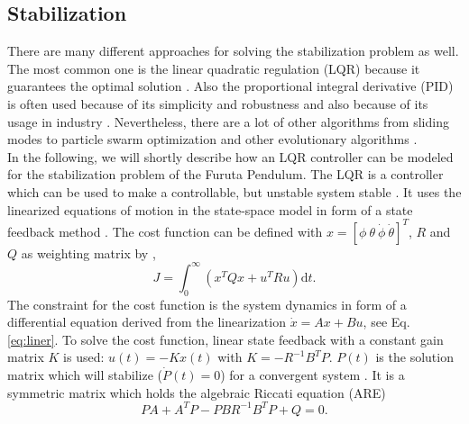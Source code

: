 \subsection{Stabilization}
There are many different approaches for solving the stabilization problem as 
well. The most common one is the linear quadratic regulation (LQR) because it 
guarantees the optimal solution \citep{hamza2019current}. Also the 
proportional integral derivative (PID) is often used because of its simplicity 
and robustness and also because of its usage in industry 
\citep{hassanzadeh2011controller}. Nevertheless, there are a lot of other 
algorithms from sliding modes \citep{izutsu2008swing} to particle swarm 
optimization and other evolutionary algorithms 
\citep{hassanzadeh2011controller}.\\
In the following, we will shortly describe how an LQR controller can be modeled 
for the stabilization problem of the Furuta Pendulum. The LQR is a controller 
which can be used to make a controllable, but unstable system stable 
\citep{park2011swing}. It uses the linearized equations of motion in the 
state-space model in form of a state feedback method \citep{ozbek2010swing}. 
The cost function can be defined with $x=[\phi \ \theta \ \dot{\phi}\ 
\dot{\theta}]^T$, $R$ and $Q$ as weighting matrix by 
\citep{al2013experimental},
\[J=\int_{0}^{\infty}\left(x^TQx+u^TRu\right)\text{d}t.\]
The constraint for the cost function is the system dynamics in form of a 
differential equation derived from the linearization $\dot{x}=Ax+Bu$, see 
Eq. \eqref{eq:liner}. To solve 
the cost function, linear state feedback with a constant gain matrix $K$ is 
used: $u(t)=-Kx(t)$ with $K=-R^{-1}B^TP$. $P(t)$ is the 
solution matrix which will stabilize ($\dot{P}(t)=0$) for a convergent system 
\citep{chen2007linear}. It 
is a symmetric matrix which holds the algebraic Riccati equation (ARE) 
\citep{al2013experimental}
\[PA+A^TP-PBR^{-1}B^TP+Q=0.\]

